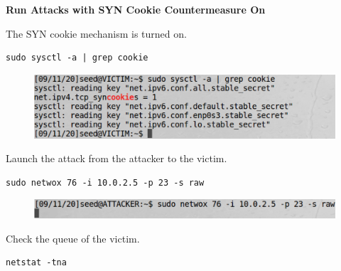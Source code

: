 \documentclass[12pt]{article}
\begin{document}
\newpage

\begin{center}
    \textbf{Run Attacks with SYN Cookie Countermeasure On}
\end{center}

\vspace{0.5in}

\noindent
The SYN cookie mechanism is turned on.

\begin{framed}
    \begin{verbatim}
sudo sysctl -a | grep cookie
    \end{verbatim}
\end{framed}

\begin{figure}[H]
    \centering
    \includegraphics[width=1\textwidth]{tcp-cookie-flag.png}
\end{figure}

\vspace{0.5in}

\noindent
Launch the attack from the attacker to the victim.

\begin{framed}
    \begin{verbatim}
sudo netwox 76 -i 10.0.2.5 -p 23 -s raw
    \end{verbatim}
\end{framed}

\begin{figure}[H]
    \centering
    \includegraphics[width=1\textwidth]{tcp-attack-on.png}
\end{figure}



\newpage

\noindent
Check the queue of the victim.

\begin{framed}
    \begin{verbatim}
netstat -tna
    \end{verbatim}
\end{framed}
\end{document}
